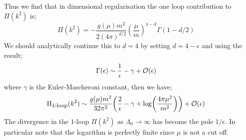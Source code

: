 Thus we find that in dimensional regularisation the one loop contribution to $\Pi(k^2)$ is;
\begin{equation*}
\Pi(k^2) = - \frac{g(\mu)m^2}{2(4\pi)^{d/2}}\left(\frac{\mu}{m}\right)^{4 - d} \Gamma(1 - d/2)
\end{equation*}
We should analytically continue this to $d = 4$ by setting $d = 4 - \epsilon$ and using the result;
\begin{equation*}
\Gamma(\epsilon) \sim \frac{1}{\epsilon} - \gamma + \mathcal{O}(\epsilon)
\end{equation*}
where $\gamma$ is the Euler-Mascheroni constant, then we have;
\begin{equation*}
\Pi_{\text{\footnotesize{1-loop}}}(k^2) \sim \frac{g(\mu)m^2}{32\pi^2} \left(\frac{2}{\epsilon} - \gamma + \log\left(\frac{4\pi\mu^2}{m^2}\right)\right) + \mO(\epsilon)
\end{equation*}
The divergence in the $1$-loop $\Pi(k^2)$ as $\Lambda_0 \rightarrow \infty$ has become the pole $1/\epsilon$. In particular note that the logarithm is perfectly finite since $\mu$ is not a cut off.
